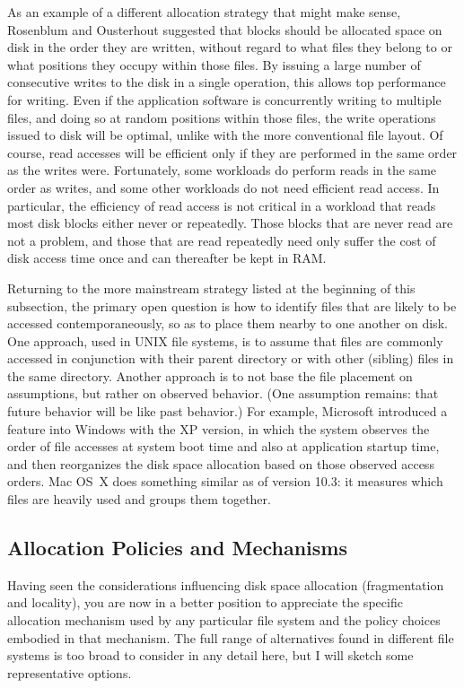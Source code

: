 As an example of a different allocation strategy that might make
sense, Rosenblum and Ousterhout suggested that blocks should be
allocated space on disk in the order they are written, without regard
to what files they belong to or what positions they occupy within
those files.  By issuing a large number of consecutive writes to the
disk in a single operation, this allows top performance for writing.
Even if the application software is concurrently writing to multiple files, and
doing so at random positions within those files, the write operations
issued to disk will be optimal, unlike with the more conventional file
layout.  Of course, read accesses will be efficient only if they are
performed in the same order as the writes were.  Fortunately, some
workloads do perform reads in the same order as writes, and some other
workloads do not need efficient read access.  In particular, the
efficiency of read access is not critical in a workload that reads most disk blocks
either never or repeatedly.  Those blocks that are never read are not a
problem, and those that are read repeatedly need only suffer the cost
of disk access time once and can thereafter be kept in RAM.

Returning to the more mainstream strategy listed at the beginning of
this subsection, the primary open question is how to identify files
that are likely to be accessed contemporaneously, so as to place them
nearby to one another on disk.  One approach, used in UNIX file
systems, is to assume that files are commonly accessed in conjunction
with their parent directory or with other (sibling) files in the same
directory.  Another approach is to not base the file placement on
assumptions, but rather on observed behavior.  (One assumption
remains: that future behavior will be like past behavior.)  For
example, Microsoft introduced a feature into Windows with the XP
version, in which the system observes the order of file accesses at
system boot time and also at application startup time, and then
reorganizes the disk space allocation based on those observed access
orders.  Mac OS~X does something similar as of version 10.3: it
measures which files are heavily used and groups them together.

\subsection{Allocation Policies and Mechanisms}
\label{fs-allocation}

Having seen the considerations influencing disk space allocation
(fragmentation and locality), you are now in a better position to
appreciate the specific allocation mechanism used by any particular
file system and the policy choices embodied in that mechanism.  The
full range of alternatives found in different file systems is too
broad to consider in any detail here, but I will sketch some
representative options.

